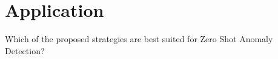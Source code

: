 \chapter{Application}
 Which of the proposed strategies are best suited for Zero Shot Anomaly Detection?